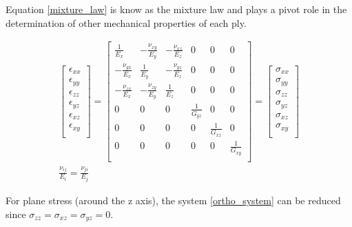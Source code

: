 Equation \eqref{mixture_law} is know as the mixture law and plays a pivot role in the determination of other mechanical properties of each ply.

\begin{gather}
\begin{bmatrix}
\epsilon_{xx}\\
\epsilon_{yy}\\
\epsilon_{zz}\\
\epsilon_{yz}\\
\epsilon_{xz}\\
\epsilon_{xy}\\
\end{bmatrix}=
\begin{bmatrix}
\frac{1}{E_x} & -\frac{\nu_{xy}}{E_y} &  -\frac{\nu_{xz}}{E_z} & 0& 0&0\\[1mm]
-\frac{\nu_{yx}}{E_x} & \frac{1}{E_y} &  -\frac{\nu_{yz}}{E_z} & 0& 0&0\\[1mm]
-\frac{\nu_{zx}}{E_x} & -\frac{\nu_{zy}}{E_y} &  \frac{1}{E_z} & 0& 0&0\\[1mm]
0 & 0 & 0 & \frac{1}{G_{yz}}  & 0 &0 \\[1mm]
0 & 0 & 0 & 0  & \frac{1}{G_{xz}} &0 \\[1mm]
0 & 0 & 0 & 0  & 0 &\frac{1}{G_{xy}} \\[1mm]
\end{bmatrix}=
\begin{bmatrix}
\sigma_{xx}\\
\sigma_{yy}\\
\sigma_{zz}\\
\sigma_{yz}\\
\sigma_{xz}\\
\sigma_{xy}\\
\end{bmatrix} \label{ortho_system}\\[2mm]
\frac{\nu_{ij}}{E_{i}}=\frac{\nu_{ji}}{E_{j}}
\end{gather}


For plane stress (around the z axis), the system \eqref{ortho_system} can be reduced since $\sigma_{zz}=\sigma_{xz}=\sigma_{yz}=0$.



